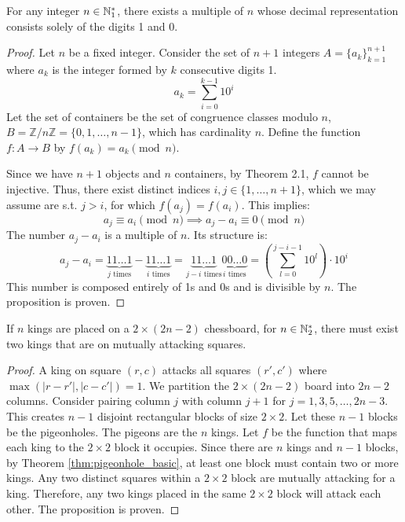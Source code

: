 \begin{proposition}\label{prop:ones_and_zeros_multiple}
For any integer $n \in \mathbb{N}_{1}^*$, there exists a multiple of $n$ whose decimal representation consists solely of the digits 1 and 0.
\end{proposition}
\begin{proof}
Let $n$ be a fixed integer. Consider the set of $n+1$ integers $A = \{a_k\}_{k=1}^{n+1}$ where $a_k$ is the integer formed by $k$ consecutive digits 1.
$$ a_k = \sum_{i=0}^{k-1} 10^i $$
Let the set of containers be the set of congruence classes modulo $n$, $B = \mathbb{Z}/n\mathbb{Z} = \{0, 1, \dots, n-1\}$, which has cardinality $n$. Define the function $f: A \to B$ by $f(a_k) = a_k \pmod n$.

Since we have $n+1$ objects and $n$ containers, by Theorem 2.1, $f$ cannot be injective. Thus, there exist distinct indices $i, j \in \{1, \dots, n+1\}$, which we may assume are s.t. $j > i$, for which $f(a_j) = f(a_i)$. This implies:
$$ a_j \equiv a_i \pmod n \implies a_j - a_i \equiv 0 \pmod n $$
The number $a_j - a_i$ is a multiple of $n$. Its structure is:
$$ a_j - a_i = \underbrace{11\dots1}_{j \text{ times}} - \underbrace{11\dots1}_{i \text{ times}} = \underbrace{11\dots1}_{j-i \text{ times}}\underbrace{00\dots0}_{i \text{ times}} = \left(\sum_{l=0}^{j-i-1} 10^l\right) \cdot 10^i $$
This number is composed entirely of 1s and 0s and is divisible by $n$. The proposition is proven.
\end{proof}

\begin{proposition}
If $n$ kings are placed on a $2 \times (2n-2)$ chessboard, for $n \in \mathbb{N}_{2}^*$, there must exist two kings that are on mutually attacking squares.
\end{proposition}
\begin{proof}
A king on square $(r,c)$ attacks all squares $(r',c')$ where $\max(|r-r'|, |c-c'|) = 1$. We partition the $2 \times (2n-2)$ board into $2n-2$ columns. Consider pairing column $j$ with column $j+1$ for $j=1,3,5,\dots,2n-3$. This creates $n-1$ disjoint rectangular blocks of size $2 \times 2$.
Let these $n-1$ blocks be the pigeonholes. The pigeons are the $n$ kings. Let $f$ be the function that maps each king to the $2 \times 2$ block it occupies. Since there are $n$ kings and $n-1$ blocks, by Theorem \ref{thm:pigeonhole_basic}, at least one block must contain two or more kings.
Any two distinct squares within a $2 \times 2$ block are mutually attacking for a king. Therefore, any two kings placed in the same $2 \times 2$ block will attack each other. The proposition is proven.
\end{proof}

